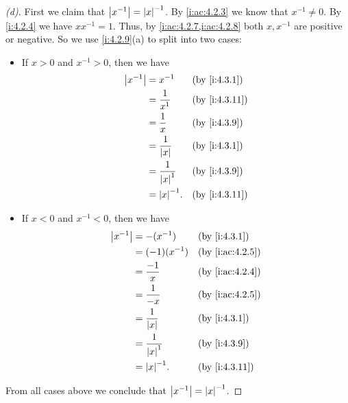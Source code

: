 \begin{proof}[(d)]
  First we claim that \(\left\lvert x^{-1}\right\rvert = \left\lvert x\right\rvert^{-1}\).
  By \cref{i:ac:4.2.3} we know that \(x^{-1} \neq 0\).
  By \cref{i:4.2.4} we have \(x x^{-1} = 1\).
  Thus, by \cref{i:ac:4.2.7,i:ac:4.2.8} both \(x, x^{-1}\) are positive or negative.
  So we use \cref{i:4.2.9}(a) to split into two cases:
  \begin{itemize}
    \item If \(x > 0\) and \(x^{-1} > 0\), then we have
          \begin{align*}
            \abs{x^{-1}} & = x^{-1}               &  & \by{i:4.3.1}  \\
                         & = \dfrac{1}{x^1}       &  & \by{i:4.3.11} \\
                         & = \dfrac{1}{x}         &  & \by{i:4.3.9}  \\
                         & = \dfrac{1}{\abs{x}}   &  & \by{i:4.3.1}  \\
                         & = \dfrac{1}{\abs{x}^1} &  & \by{i:4.3.9}  \\
                         & = \abs{x}^{-1}.        &  & \by{i:4.3.11}
          \end{align*}
    \item If \(x < 0\) and \(x^{-1} < 0\), then we have
          \begin{align*}
            \abs{x^{-1}} & = -(x^{-1})            &  & \by{i:4.3.1}    \\
                         & = (-1) (x^{-1})        &  & \by{i:ac:4.2.5} \\
                         & = \dfrac{-1}{x}        &  & \by{i:ac:4.2.4} \\
                         & = \dfrac{1}{-x}        &  & \by{i:ac:4.2.5} \\
                         & = \dfrac{1}{\abs{x}}   &  & \by{i:4.3.1}    \\
                         & = \dfrac{1}{\abs{x}^1} &  & \by{i:4.3.9}    \\
                         & = \abs{x}^{-1}.        &  & \by{i:4.3.11}
          \end{align*}
  \end{itemize}
  From all cases above we conclude that \(\left\lvert x^{-1}\right\rvert = \left\lvert x\right\rvert^{-1}\).


\end{proof}
